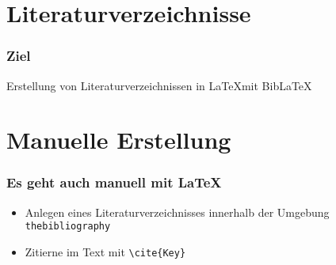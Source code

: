 \section{Literaturverzeichnisse}

\begin{frame}
  \frametitle{Ziel}

  \begin{center}
  Erstellung von Literaturverzeichnissen in \LaTeX mit Bib\LaTeX
  \end{center}

\end{frame}

\section{Manuelle Erstellung}

\begin{frame}[fragile]
  \frametitle{Es geht auch manuell mit \LaTeX}
  \onslide<+->

  \begin{itemize}
    \item<+-> Anlegen eines Literaturverzeichnisses innerhalb der Umgebung \lstinline!thebibliography!
    \item<+-> Zitierne im Text mit \lstinline!\cite{Key}!
  \end{itemize}
\end{frame}

